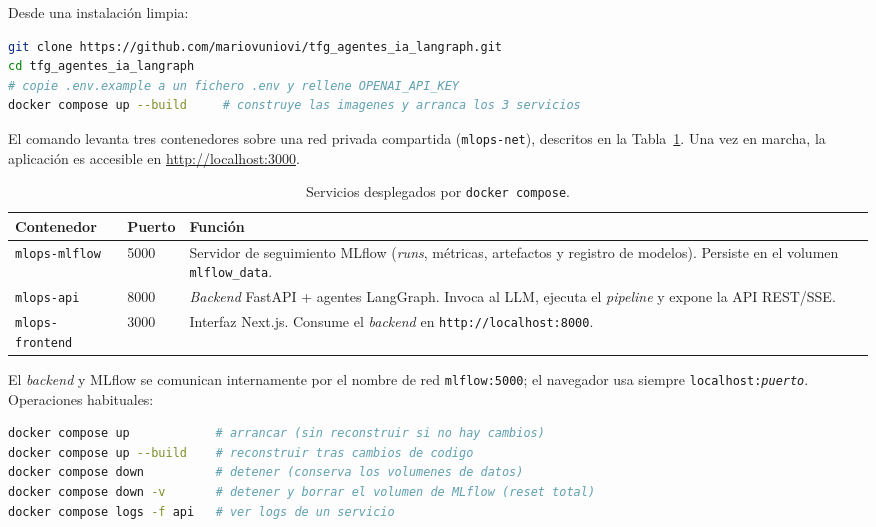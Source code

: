 Desde una instalación limpia:

\begin{lstlisting}[language=bash]
git clone https://github.com/mariovuniovi/tfg_agentes_ia_langraph.git
cd tfg_agentes_ia_langraph
# copie .env.example a un fichero .env y rellene OPENAI_API_KEY
docker compose up --build     # construye las imagenes y arranca los 3 servicios
\end{lstlisting}

El comando levanta tres contenedores sobre una red privada compartida
(\texttt{mlops-net}), descritos en la Tabla~\ref{tab:repro-servicios}. Una vez en marcha,
la aplicación es accesible en \url{http://localhost:3000}.

\begin{table}[H]
\centering
\caption{Servicios desplegados por \texttt{docker compose}.}
\label{tab:repro-servicios}
\small
\setlength{\tabcolsep}{5pt}
\begin{tabular}{lll}
\toprule
\textbf{Contenedor} & \textbf{Puerto} & \textbf{Función} \\
\midrule
\texttt{mlops-mlflow}   & 5000 & Servidor de seguimiento MLflow (\textit{runs}, métricas,
                                 artefactos y registro de modelos). Persiste en el volumen
                                 \texttt{mlflow\_data}. \\
\texttt{mlops-api}      & 8000 & \textit{Backend} FastAPI + agentes LangGraph. Invoca al
                                 LLM, ejecuta el \textit{pipeline} y expone la API REST/SSE. \\
\texttt{mlops-frontend} & 3000 & Interfaz Next.js. Consume el \textit{backend} en
                                 \texttt{http://localhost:8000}. \\
\bottomrule
\end{tabular}
\end{table}

\noindent
El \textit{backend} y MLflow se comunican internamente por el nombre de red
\texttt{mlflow:5000}; el navegador usa siempre \texttt{localhost:\textit{puerto}}.
Operaciones habituales:

\begin{lstlisting}[language=bash]
docker compose up            # arrancar (sin reconstruir si no hay cambios)
docker compose up --build    # reconstruir tras cambios de codigo
docker compose down          # detener (conserva los volumenes de datos)
docker compose down -v       # detener y borrar el volumen de MLflow (reset total)
docker compose logs -f api   # ver logs de un servicio
\end{lstlisting}

